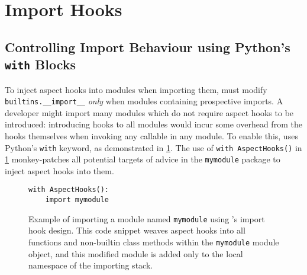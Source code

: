 \section{Import Hooks}\label{sec:import_hooks}

\subsection{Controlling Import Behaviour using Python's \lstinline{with} Blocks}\label{pdsf3implementingimporthooks}


To inject aspect hooks into modules when importing them, \pdsf{} must modify
\lstinline{builtins.__import__} \emph{only} when modules containing prospective
imports. A developer might import many modules which do not require aspect hooks
to be introduced: introducing hooks to all modules would incur some overhead
from the hooks themselves when invoking any callable in any module. To enable
this, \pdsf{} uses Python's \lstinline{with} keyword, as demonstrated in
\cref{fig:simple_aspect_hook_weaving_example}. The use of
\lstinline{with AspectHooks()} in \cref{fig:simple_aspect_hook_weaving_example} monkey-patches
all potential targets of advice in the \lstinline{mymodule} package to inject
aspect hooks into them.

\begin{figure}
    \centering
    \begin{lstlisting}
with AspectHooks():
    import mymodule
    \end{lstlisting}
    \caption{Example of importing a module named \lstinline{mymodule} using
    \pdsf{}'s import hook design. This code snippet weaves aspect hooks into all
    functions and non-builtin class methods within the \lstinline{mymodule}
    module object, and this modified module is added only to the local namespace
    of the importing stack.}
    \label{fig:simple_aspect_hook_weaving_example}
\end{figure}

